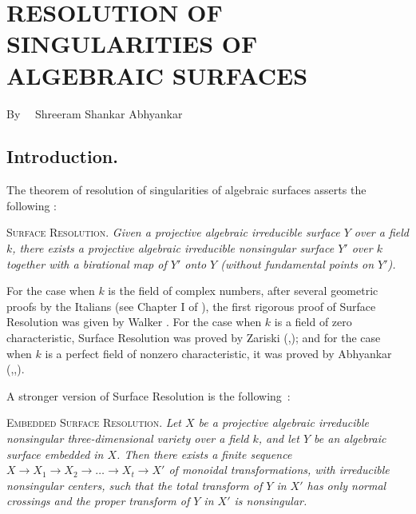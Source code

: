 \chapter[\textsc{S. S. Abhyankar} : Resolution of Singularities of Algebraic Surfaces]{RESOLUTION OF SINGULARITIES OF ALGEBRAIC SURFACES}

\begin{center}
By~~ Shreeram Shankar Abhyankar
\end{center}



\setcounter{pageoriginal}{0}
\section{Introduction.}\label{art01-sec1}
\pageoriginale 



The theorem of resolution of singularities of algebraic surfaces asserts the following :

\textsc{Surface Resolution.} {\em Given a projective algebraic irreducible surface $Y$ over a field $k$, there exists a projective algebraic irreducible nonsingular surface $Y'$ over $k$ together with a birational map of $Y'$ onto $Y$ (without fundamental points on $Y'$).}

For the case when $k$ is the field of complex numbers, after several geometric proofs by the Italians (see Chapter I of \cite{art01-key15}), the first rigorous proof of Surface Resolution was given by Walker \cite{art01-key14}. For the case when $k$ is a field of zero characteristic, Surface Resolution was proved by Zariski (\cite{art01-key16},\cite{art01-key17}); and for the case when $k$ is a perfect field of nonzero characteristic, it was proved by Abhyankar (\cite{art01-key2},\cite{art01-key3},\cite{art01-key4}).

A stronger version of Surface Resolution is the following~:

\medskip
\textsc{Embedded Surface Resolution.} {\em Let $X$ be a projective algebraic irreducible nonsingular three-dimensional variety over a field $k$, and let $Y$ be an algebraic surface embedded in $X$. Then there exists a finite sequence $X\to X_{1}\to X_{2}\to \ldots\to X_{t}\to X'$ of monoidal transformations, with irreducible nonsingular centers, such that the total transform of $Y$ in $X'$ has only normal crossings and the proper transform of $Y$ in $X'$ is nonsingular.}

